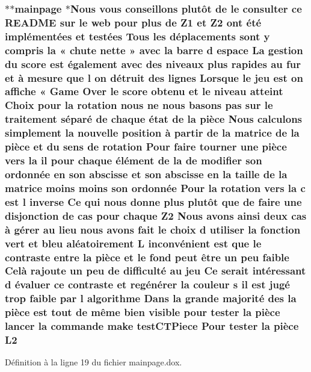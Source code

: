 \hypertarget{mainpage_8dox_a6cd08d66186ab814d4376a13bff53d31}{
\subsubsection[{L2}]{\setlength{\rightskip}{0pt plus 5cm}$\ast$$\ast$mainpage $\ast$Nous vous conseillons plutô{\bf t} {\bf de} le consulter ce R\-E\-A\-D\-M\-E sur le web pour plus {\bf de} {\bf Z1} et Z2 ont é{\bf t}é implémentées et testées Tous les déplacements sont {\bf y} compris la « chute nette » avec la barre d espace La gestion du score est également avec des niveaux plus rapides au fur et à mesure que l on détruit des lignes Lorsque le jeu est on affiche « Game Over le score obtenu et le niveau atteint Choix pour la rotation nous ne nous basons pas sur le traitement {\bf s}éparé {\bf de} chaque état {\bf de} la pièce Nous calculons simplement la nouvelle position à partir {\bf de} la {\bf matrice} {\bf de} la pièce et du {\bf sens} {\bf de} rotation Pour faire tourner une pièce vers la il pour chaque élément {\bf de} la {\bf de} modifier son ordonnée en son abscisse et son abscisse en la taille {\bf de} la {\bf matrice} moins moins son ordonnée Pour la rotation vers la {\bf c} est l inverse Ce qui nous donne plus plutô{\bf t} que {\bf de} faire une disjonction {\bf de} {\bf cas} pour chaque Z2 Nous avons ainsi deux {\bf cas} à {\bf g}érer au lieu nous avons fait le choix d utiliser la fonction vert et bleu aléatoirement L inconvénient est que le contraste entre la pièce et le fond peut être un peu faible Celà rajoute un peu {\bf de} difficulté au jeu Ce serait intéressant d évaluer ce contraste et regé{\bf n}érer la couleur {\bf s} il est jugé trop faible par l algorithme Dans la grande majorité des la pièce est tout {\bf de} {\bf m}ême bien visible pour tester la pièce lancer la commande make test\-C\-T\-Piece Pour tester la pièce L2}}\label{mainpage_8dox_a6cd08d66186ab814d4376a13bff53d31}


Définition à la ligne 19 du fichier mainpage.\-dox.

